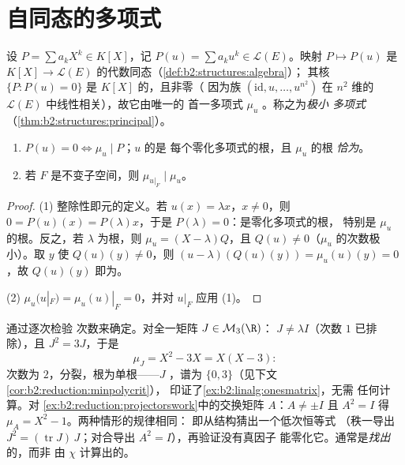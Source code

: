\section{自同态的多项式}

\begin{definition}\label{def:b2:reduction:polyu}
设 $P = \sum a_k X^k \in K[X]$，记 $P(u) = \sum a_k u^k \in
\mathcal{L}(E)$。映射 $P \mapsto P(u)$ 是
$K[X] \to \mathcal{L}(E)$ 的代数同态（\cref{def:b2:structures:algebra}）；
其核 $\{P : P(u) = 0\}$ 是 $K[X]$ 的，且非零（
因为族 $(\mathrm{id}, u, \dots, u^{n^2})$ 在
$n^2$ 维的 $\mathcal{L}(E)$ 中线性相关），故它由唯一的
首一多项式 $\mu_u$ 。称之为\emph{极小
多项式}
（\cref{thm:b2:structures:principal}）。
\end{definition}

\begin{proposition}\label{prop:b2:reduction:minpoly}
\begin{enumerate}
  \item $P(u) = 0 \iff \mu_u \mid P$；$u$ 的是
        每个零化多项式的根，且 $\mu_u$ 的根
        \emph{恰为}。
  \item 若 $F$ 是不变子空间，则 $\mu_{u|_F} \mid \mu_u$。
\end{enumerate}
\end{proposition}

\begin{proof}
(1) 整除性即元的定义。若 $u(x) =
\lambda x$，$x \neq 0$，则 $0 = P(u)(x) = P(\lambda)x$，于是
$P(\lambda) = 0$：是零化多项式的根，
特别是 $\mu_u$ 的根。反之，若 $\lambda$ 为根，则 $\mu_u =
(X - \lambda)Q$，且 $Q(u) \neq 0$（$\mu_u$ 的次数极小）。取
$y$ 使 $Q(u)(y) \neq 0$，则 $(u - \lambda)(Q(u)(y)) = \mu_u(u)(y)
= 0$，故 $Q(u)(y)$ 即为。

(2) $\mu_u(u|_F) = \mu_u(u)|_F = 0$，并对 $u|_F$ 应用 (1)。
\end{proof}

\begin{example}[手工求极小多项式]\label{ex:b2:reduction:minpolyhand}
通过逐次检验
次数来确定。对全一矩阵 $J \in \mathcal{M}_3(\R)$：
$J \neq \lambda I$（次数 $1$ 已排除），且 $J^2 = 3J$，于是
\[
\mu_J = X^2 - 3X = X(X - 3) :
\]
次数为 $2$，分裂，根为单根——$J$ ，谱为
$\{0, 3\}$（见下文\cref{cor:b2:reduction:minpolycrit}），
印证了\cref{ex:b2:linalg:onesmatrix}，无需
任何计算。对
\cref{ex:b2:reduction:projectorswork}中的交换矩阵 $A$：$A \neq \pm I$ 且 $A^2
= I$ 得 $\mu_A = X^2 - 1$。两种情形的规律相同：
即从结构猜出一个低次恒等式
（秩一导出 $J^2 = (\operatorname{tr}J)\,J$；对合导出
$A^2 = I$），再验证没有真因子
能零化它。通常是\emph{找出}的，而非
由 $\chi$ 计算出的。
\end{example}

